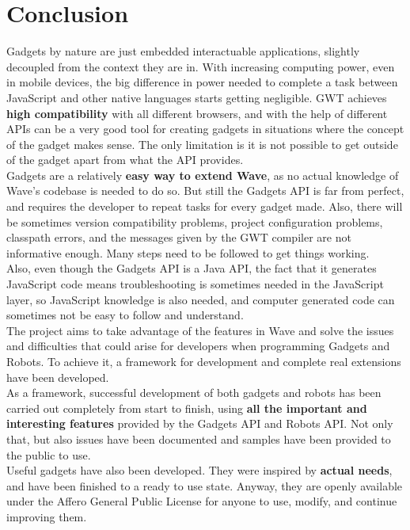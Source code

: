 \section{Conclusion}
Gadgets by nature are just embedded interactuable applications, slightly decoupled from the context they are in. With increasing computing power, even in mobile devices, the big difference \cite{ref:javascript_slow} in power needed to complete a task between JavaScript and other native languages starts getting negligible. GWT achieves \textbf{high compatibility} with all different browsers, and with the help of different APIs can be a very good tool for creating gadgets in situations where the concept of the gadget makes sense. The only limitation is it is not possible to get outside of the gadget apart from what the API provides.\\[.2cm]
Gadgets are a relatively \textbf{easy way to extend Wave}, as no actual knowledge of Wave's codebase is needed to do so. But still the Gadgets API is far from perfect, and requires the developer to repeat tasks for every gadget made. Also, there will be sometimes version compatibility problems, project configuration problems, classpath errors, and the messages given by the GWT compiler are not informative enough. Many steps need to be followed to get things working.\\[.2cm]
Also, even though the Gadgets API is a Java API, the fact that it generates JavaScript code means troubleshooting is sometimes needed in the JavaScript layer, so JavaScript knowledge is also needed, and computer generated code can sometimes not be easy to follow and understand.\\[.2cm]
The project aims to take advantage of the features in Wave and solve the issues and difficulties that could arise for developers when programming Gadgets and Robots. To achieve it, a framework for development and complete real extensions have been developed.\\[.2cm]
As a framework, successful development of both gadgets and robots has been carried out completely from start to finish, using \textbf{all the important and interesting features} provided by the Gadgets API and Robots API. Not only that, but also issues have been documented and samples have been provided to the public to use.\\[.2cm]
Useful gadgets have also been developed. They were inspired by \textbf{actual needs}, and have been finished to a ready to use state. Anyway, they are openly available under the Affero General Public License\cite{ref:agpl} for anyone to use, modify, and continue improving them.

